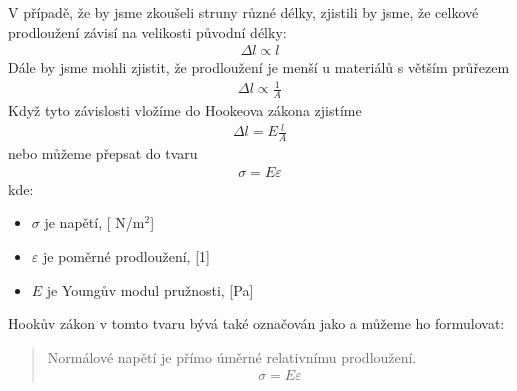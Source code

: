 \documentclass[letterpaper,10pt,english]{jupyterBook}
\begin{document}
\sphinxAtStartPar
V případě, že by jsme zkoušeli struny různé délky, zjistili by jsme, že celkové prodloužení závisí na velikosti původní délky:
\begin{equation*}
\begin{split}\Delta l \propto l\end{split}
\end{equation*}
\sphinxAtStartPar
Dále by jsme mohli zjistit, že prodloužení je menší u materiálů s větším průřezem
\begin{equation*}
\begin{split}\Delta l \propto \frac{1}{A}\end{split}
\end{equation*}
\sphinxAtStartPar
Když tyto závislosti vložíme do Hookeova zákona zjistíme
\begin{equation*}
\begin{split}\Delta l = E \frac{l}{A} \end{split}
\end{equation*}
\sphinxAtStartPar
nebo můžeme přepsat do tvaru
\begin{equation*}
\begin{split}\sigma = E \varepsilon \end{split}
\end{equation*}
\sphinxAtStartPar
kde:
\begin{itemize}
\item {} 
\sphinxAtStartPar
\(\sigma\) je napětí, {[} N/m\(^2\){]}

\item {} 
\sphinxAtStartPar
\(\varepsilon\) je poměrné prodloužení, {[}1{]}

\item {} 
\sphinxAtStartPar
\(E\) je Youngův modul pružnosti, {[}Pa{]}

\end{itemize}

\sphinxAtStartPar
Hookův zákon v tomto tvaru bývá také označován jako  a můžeme ho formulovat:
\begin{quote}

\sphinxAtStartPar
Normálové napětí je přímo úměrné relativnímu prodloužení.
\begin{equation*}
\begin{split} \sigma = E \varepsilon \end{split}
\end{equation*}\end{quote}
\end{document}
